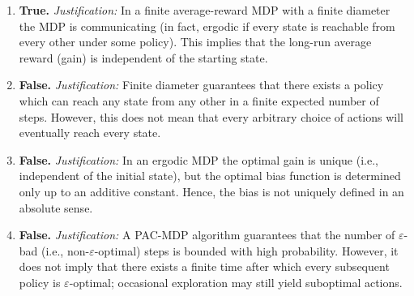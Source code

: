 \begin{enumerate}[label=\textbf{\arabic*.}] \item \textbf{True.} \emph{Justification:} In a finite average-reward MDP with a finite diameter the MDP is communicating (in fact, ergodic if every state is reachable from every other under some policy). This implies that the long-run average reward (gain) is independent of the starting state.

    \item \textbf{False.} \emph{Justification:} Finite diameter guarantees that there exists a policy which can reach any state from any other in a finite expected number of steps. However, this does not mean that every arbitrary choice of actions will eventually reach every state.
    
    \item \textbf{False.} \emph{Justification:} In an ergodic MDP the optimal gain is unique (i.e., independent of the initial state), but the optimal bias function is determined only up to an additive constant. Hence, the bias is not uniquely defined in an absolute sense.
    
    \item \textbf{False.} \emph{Justification:} A PAC-MDP algorithm guarantees that the number of $\varepsilon$-bad (i.e., non-$\varepsilon$-optimal) steps is bounded with high probability. However, it does not imply that there exists a finite time after which every subsequent policy is $\varepsilon$-optimal; occasional exploration may still yield suboptimal actions.
\end{enumerate}